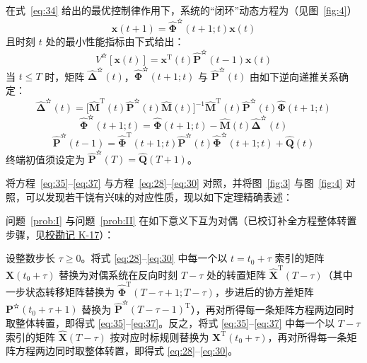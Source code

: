 在式~\eqref{eq:34} 给出的最优控制律作用下，系统的“闭环”动态方程为（见图~\ref{fig:4}）
\begin{equation*}
\bm{x}(t + 1) = \hat{\bm{\Phi}}^{\text{✫}}(t + 1; t)\bm{x}(t)
\end{equation*}
且时刻 $t$ 处的最小性能指标由下式给出：
\begin{equation*}
V^{\text{✫}}[\bm{x}(t)] = \bm{x}^{\mathrm{T}}(t)\hat{\bm{P}}^{\text{✫}}(t - 1)\bm{x}(t)
\end{equation*}
当 $t \leq T$ 时，矩阵 $\hat{\bm{\Delta}}^{\text{✫}}(t)$，$\hat{\bm{\Phi}}^{\text{✫}}(t + 1; t)$ 与 $\hat{\bm{P}}^{\text{✫}}(t)$ 由如下逆向递推关系确定：
\begin{equation}\label{eq:35}
\hat{\bm{\Delta}}^{\text{✫}}(t) = \bigl[\hat{\bm{M}}^{\mathrm{T}}(t)\hat{\bm{P}}^{\text{✫}}(t)\hat{\bm{M}}(t)\bigr]^{-1}\hat{\bm{M}}^{\mathrm{T}}(t)\hat{\bm{P}}^{\text{✫}}(t)\hat{\bm{\Phi}}(t + 1; t)
\end{equation}
\begin{equation}\label{eq:36}
\hat{\bm{\Phi}}^{\text{✫}}(t + 1; t) = \hat{\bm{\Phi}}(t + 1; t) - \hat{\bm{M}}(t)\hat{\bm{\Delta}}^{\text{✫}}(t)
\end{equation}
\begin{equation}\label{eq:37}
\hat{\bm{P}}^{\text{✫}}(t - 1) = \hat{\bm{\Phi}}^{\mathrm{T}}(t + 1; t)\hat{\bm{P}}^{\text{✫}}(t)\hat{\bm{\Phi}}^{\text{✫}}(t + 1; t) + \hat{\bm{Q}}(t)
\end{equation}
终端初值须设定为 $\hat{\bm{P}}^{\text{✫}}(T) = \hat{\bm{Q}}(T + 1)$。


将方程~\eqref{eq:35}–\eqref{eq:37} 与方程~\eqref{eq:28}–\eqref{eq:30} 对照，并将图~\ref{fig:3} 与图~\ref{fig:4} 对照，可以发现若干饶有兴味的对应性质，现以如下定理精确表述：

\begin{theorem}[对偶定理]\label{thm:4}

问题~\ref{prob:I} 与问题~\ref{prob:II} 在如下意义下互为对偶（已校订补全方程整体转置步骤，见\hyperref[sec:k17]{校勘记 K-17}）：

设整数步长 $\tau \geq 0$。将式 \eqref{eq:28}–\eqref{eq:30} 中每一个以 $t = t_0 + \tau$ 索引的矩阵 $\bm{X}(t_0 + \tau)$ 替换为对偶系统在反向时刻 $T - \tau$ 处的转置矩阵 $\hat{\bm{X}}^{\mathrm{T}}(T - \tau)$（其中一步状态转移矩阵替换为 $\hat{\bm{\Phi}}^{\mathrm{T}}(T - \tau + 1; T - \tau)$，步进后的协方差矩阵 $\bm{P}^{\text{✫}}(t_0 + \tau + 1)$ 替换为 $\hat{\bm{P}}^{\text{✫}}(T - \tau - 1)^{\mathrm{T}}$），再对所得每一条矩阵方程两边同时取整体转置，即得式 \eqref{eq:35}–\eqref{eq:37}。反之，将式 \eqref{eq:35}–\eqref{eq:37} 中每一个以 $T - \tau$ 索引的矩阵 $\hat{\bm{X}}(T - \tau)$ 按对应时标规则替换为 $\bm{X}^{\mathrm{T}}(t_0 + \tau)$，再对所得每一条矩阵方程两边同时取整体转置，即得式 \eqref{eq:28}–\eqref{eq:30}。

\end{theorem}

